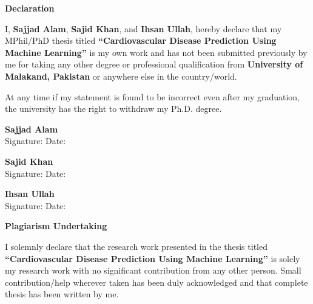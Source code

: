 \documentclass[12pt, a4paper, oneside]{book}
\newcommand{\thesistitle}{Cardiovascular Disease Prediction Using Machine Learning}
\newcommand{\thesisauthorA}{Sajjad Alam}
\newcommand{\thesisauthorB}{Sajid Khan}
\newcommand{\thesisauthorC}{Ihsan Ullah}
\newcommand{\thesisuni}{University of Malakand}
\begin{document}
\setcounter{page}{2}

\clearpage
\thispagestyle{plain}
\vspace*{0.5cm}
\begin{center}
{\fontsize{14pt}{16pt}\selectfont \textbf{Declaration}\par}
\end{center}
\vspace{0.4in}

\noindent I, \textbf{\thesisauthorA}, \textbf{\thesisauthorB}, and \textbf{\thesisauthorC}, hereby declare that my MPhil/PhD thesis titled \textbf{``\thesistitle''} is my own work and has not been submitted previously by me for taking any other degree or professional qualification from \textbf{\thesisuni, Pakistan} or anywhere else in the country/world.

\noindent At any time if my statement is found to be incorrect even after my graduation, the university has the right to withdraw my Ph.D. degree.

\vspace{1.2in}

\noindent \textbf{\thesisauthorA}\\
Signature: \hrulefill \quad Date: \hrulefill

\vspace{0.3in}
\noindent \textbf{\thesisauthorB}\\
Signature: \hrulefill \quad Date: \hrulefill

\vspace{0.3in}
\noindent \textbf{\thesisauthorC}\\
Signature: \hrulefill \quad Date: \hrulefill

\clearpage
\thispagestyle{plain}
\vspace*{0.5cm}
\begin{center}
{\fontsize{14pt}{16pt}\selectfont \textbf{Plagiarism Undertaking}\par}
\end{center}
\vspace{0.4in}

\noindent I solemnly declare that the research work presented in the thesis titled \textbf{``\thesistitle''} is solely my research work with no significant contribution from any other person. Small contribution/help wherever taken has been duly acknowledged and that complete thesis has been written by me.
\end{document}
